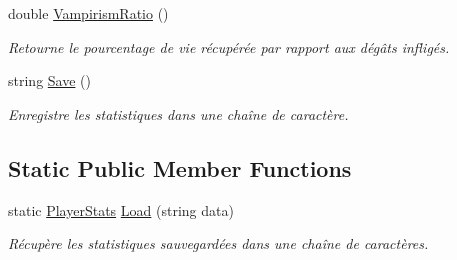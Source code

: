 \begin{DoxyCompactItemize}
double \hyperlink{class_tentacle_slicers_1_1actors_1_1_player_stats_aee8ecef8466079afcd359984e9bfc7dd}{Vampirism\+Ratio} ()
\begin{DoxyCompactList}\small\item\em Retourne le pourcentage de vie récupérée par rapport aux dégâts infligés. \end{DoxyCompactList}\item 
string \hyperlink{class_tentacle_slicers_1_1actors_1_1_player_stats_a0d09e82d6cd66e67a8100c67a7b977ba}{Save} ()
\begin{DoxyCompactList}\small\item\em Enregistre les statistiques dans une chaîne de caractère. \end{DoxyCompactList}\end{DoxyCompactItemize}
\subsection*{Static Public Member Functions}
\begin{DoxyCompactItemize}
\item 
static \hyperlink{class_tentacle_slicers_1_1actors_1_1_player_stats}{Player\+Stats} \hyperlink{class_tentacle_slicers_1_1actors_1_1_player_stats_a9e9edcd409cbe2f955f4f7313c4a36dd}{Load} (string data)
\begin{DoxyCompactList}\small\item\em Récupère les statistiques sauvegardées dans une chaîne de caractères. \end{DoxyCompactList}\end{DoxyCompactItemize}
